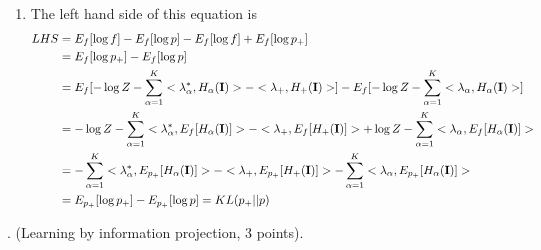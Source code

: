 \documentclass[11pt]{article}
\newcommand{\I}{{\bf I}}
\begin{document}
\begin{enumerate}
    \item
    The left hand side of this equation is
    $$
    \begin{aligned}
    LHS &= E_f[\log f] - E_f[\log p] - E_f[\log f] + E_f[\log p_+] \\
        &= E_f[\log p_+] - E_f[\log p] \\
        &= E_f[-\log Z -\sum_{\alpha=1}^{K}<\lambda^*_\alpha, H_\alpha(\I)> - <\lambda_+, H_+(\I)>] - E_f[-\log Z -\sum_{\alpha=1}^{K}<\lambda_\alpha, H_\alpha(\I)>] \\
        &= -\log Z - \sum_{\alpha=1}^{K}<\lambda^*_\alpha, E_f[H_\alpha(\I)]> - <\lambda_+, E_f[H_+(\I)]> + \log Z - \sum_{\alpha=1}^{K}<\lambda_\alpha, E_f[H_\alpha(\I)]> \\
        &= - \sum_{\alpha=1}^{K}<\lambda^*_\alpha, E_{p_+}[H_\alpha(\I)]> - <\lambda_+, E_{p_+}[H_+(\I)]>  - \sum_{\alpha=1}^{K}<\lambda_\alpha, E_{p_+}[H_\alpha(\I)]> \\
        &= E_{p_+}[\log p_+] - E_{p_+}[\log p] = KL(p_+||p)
    \end{aligned}
    $$
\end{enumerate}

. (Learning by information projection, 3 points).
\end{document}

